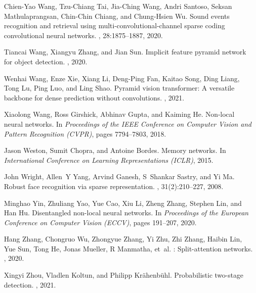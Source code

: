 \documentclass[10pt,twocolumn,letterpaper]{article}
\begin{document}
{\begin{thebibliography}{10}
	Chien-Yao Wang, Tzu-Chiang Tai, Jia-Ching Wang, Andri Santoso, Seksan
	Mathulaprangsan, Chin-Chin Chiang, and Chung-Hsien Wu.
	\newblock Sound events recognition and retrieval using
	multi-convolutional-channel sparse coding convolutional neural networks.
	, 28:1875--1887, 2020.
	
	Tiancai Wang, Xiangyu Zhang, and Jian Sun.
	\newblock Implicit feature pyramid network for object detection.
	, 2020.
	
	Wenhai Wang, Enze Xie, Xiang Li, Deng-Ping Fan, Kaitao Song, Ding Liang, Tong
	Lu, Ping Luo, and Ling Shao.
	\newblock Pyramid vision transformer: A versatile backbone for dense prediction
	without convolutions.
	, 2021.
	
	Xiaolong Wang, Ross Girshick, Abhinav Gupta, and Kaiming He.
	\newblock Non-local neural networks.
	\newblock In {\em Proceedings of the IEEE Conference on Computer Vision and
		Pattern Recognition (CVPR)}, pages 7794--7803, 2018.
	
	Jason Weston, Sumit Chopra, and Antoine Bordes.
	\newblock Memory networks.
	\newblock In {\em International Conference on Learning Representations (ICLR)},
	2015.
	
	John Wright, Allen~Y Yang, Arvind Ganesh, S~Shankar Sastry, and Yi Ma.
	\newblock Robust face recognition via sparse representation.
	, 31(2):210--227, 2008.
	
	Minghao Yin, Zhuliang Yao, Yue Cao, Xiu Li, Zheng Zhang, Stephen Lin, and Han
	Hu.
	\newblock Disentangled non-local neural networks.
	\newblock In {\em Proceedings of the European Conference on Computer Vision
		(ECCV)}, pages 191--207, 2020.
	
	Hang Zhang, Chongruo Wu, Zhongyue Zhang, Yi Zhu, Zhi Zhang, Haibin Lin, Yue
	Sun, Tong He, Jonas Mueller, R Manmatha, et~al.
	: Split-attention networks.
	, 2020.
	
	Xingyi Zhou, Vladlen Koltun, and Philipp Kr{\"a}henb{\"u}hl.
	\newblock Probabilistic two-stage detection.
	, 2021.
	
	\end{thebibliography}
}
\end{document}
